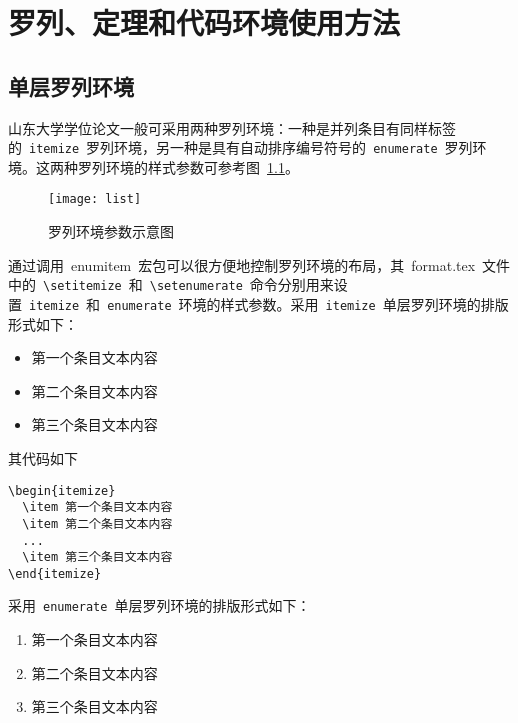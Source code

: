 
\chapter{罗列、定理和代码环境使用方法}

\section{单层罗列环境}

山东大学学位论文一般可采用两种罗列环境：一种是并列条目有同样标签的~\verb|itemize|~罗列环境，另一种是具有自动排序编号符号的~\verb|enumerate|~罗列环境。这两种罗列环境的样式参数可参考图~\ref{fig:list}。
\begin{figure}[htbp]
\centering
\texttt{[image: list]}
\caption{罗列环境参数示意图}\label{fig:list}\vspace{-1em}
\end{figure}

通过调用~enumitem~宏包可以很方便地控制罗列环境的布局，其~format.tex~文件中的~\verb|\setitemize|~和~\verb|\setenumerate|~命令分别用来设置~\verb|itemize|~和~\verb|enumerate|~环境的样式参数。采用~\verb|itemize|~单层罗列环境的排版形式如下：

\begin{itemize}
\item 第一个条目文本内容
\item 第二个条目文本内容
\item 第三个条目文本内容
\end{itemize}

其代码如下

\begin{verbatim}
\begin{itemize}
  \item 第一个条目文本内容
  \item 第二个条目文本内容
  ...
  \item 第三个条目文本内容
\end{itemize}
\end{verbatim}

采用~\verb|enumerate|~单层罗列环境的排版形式如下：

\begin{enumerate}
\item 第一个条目文本内容
\item 第二个条目文本内容
\item 第三个条目文本内容
\end{enumerate}

